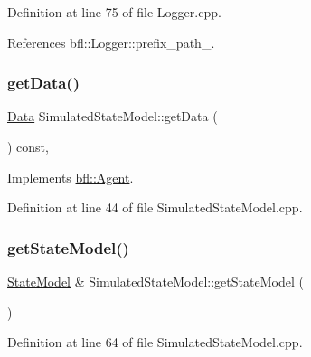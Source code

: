 Definition at line 75 of file Logger.\+cpp.



References bfl\+::\+Logger\+::prefix\+\_\+path\+\_\+.

\mbox{\label{classbfl_1_1SimulatedStateModel_a23aa6df27179a9a48b48cf4002508ba9}} 
\subsubsection{\texorpdfstring{get\+Data()}{getData()}}
{\footnotesize\ttfamily \mbox{\hyperlink{namespacebfl_af6b103c6821db1b54452f776fdd9dd02}{Data}} Simulated\+State\+Model\+::get\+Data (\begin{DoxyParamCaption}{ }\end{DoxyParamCaption}) const\hspace{0.3cm}{\ttfamily [override]}, {\ttfamily [virtual]}}



Implements \mbox{\hyperlink{classbfl_1_1Agent_a38522a865006e91ab426fe3bf3a6d4c8}{bfl\+::\+Agent}}.



Definition at line 44 of file Simulated\+State\+Model.\+cpp.

\mbox{\label{classbfl_1_1SimulatedStateModel_a294e8a17e51310218295945276021f2f}} 
\subsubsection{\texorpdfstring{get\+State\+Model()}{getStateModel()}}
{\footnotesize\ttfamily \mbox{\hyperlink{classbfl_1_1StateModel}{State\+Model}} \& Simulated\+State\+Model\+::get\+State\+Model (\begin{DoxyParamCaption}{ }\end{DoxyParamCaption})}



Definition at line 64 of file Simulated\+State\+Model.\+cpp.

\mbox{\label{classbfl_1_1SimulatedStateModel_aa022eb0d50d898ffcc831af2907265b2}} 
